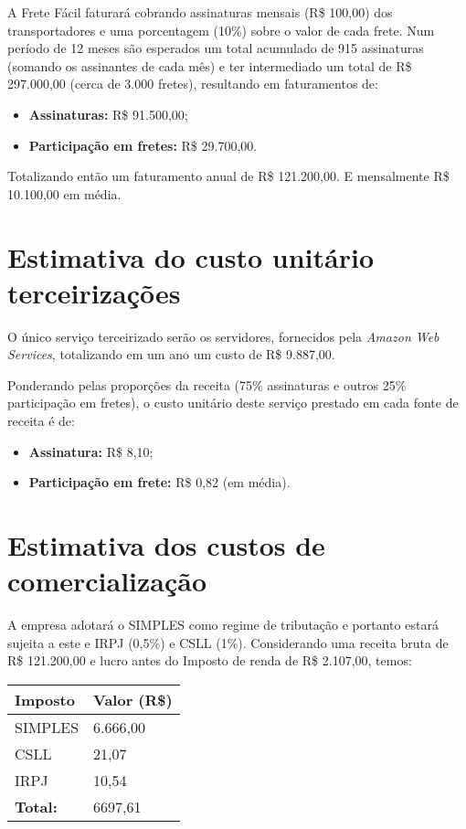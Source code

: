 A Frete Fácil faturará cobrando assinaturas mensais (R\$ 100,00) dos transportadores e uma porcentagem (10\%) sobre o valor de cada frete. Num período de 12 meses são esperados um total acumulado de 915 assinaturas (somando os assinantes de cada mês) e ter intermediado um total de R\$ 297.000,00 (cerca de 3.000 fretes), resultando em faturamentos de:

\begin{itemize}
  \item \textbf{Assinaturas:} R\$ 91.500,00;
  \item \textbf{Participação em fretes:} R\$ 29.700,00.
\end{itemize}

Totalizando então um faturamento anual de R\$ 121.200,00. E mensalmente R\$ 10.100,00 em média.

\section{Estimativa do custo unitário terceirizações}\label{sec:custounitario}

O único serviço terceirizado serão os servidores, fornecidos pela \textit{Amazon Web Services}, totalizando em um ano um custo de R\$ 9.887,00.

Ponderando pelas proporções da receita (75\% assinaturas e outros 25\% participação em fretes), o custo unitário deste serviço prestado em cada fonte de receita é de:

\begin{itemize}
  \item \textbf{Assinatura:} R\$ 8,10;
  \item \textbf{Participação em frete:} R\$ 0,82 (em média).
\end{itemize}

\section{Estimativa dos custos de comercialização}
A empresa adotará o SIMPLES como regime de tributação e portanto estará sujeita a este e IRPJ (0,5\%) e CSLL (1\%). Considerando uma receita bruta de R\$ 121.200,00 e lucro antes do Imposto de renda de R\$ 2.107,00, temos:
\newline \newline
\begin{tabular}{| l | l |}
  \hline
  \textbf{Imposto} & \textbf{Valor (R\$)}\\ \hline
  SIMPLES & 6.666,00 \\ \hline
  CSLL & 21,07 \\ \hline
  IRPJ & 10,54 \\ \hline
  \textbf{Total:} & 6697,61 \\ \hline
\end{tabular}

